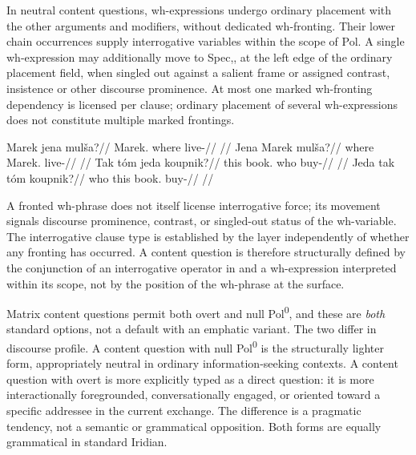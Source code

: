 In neutral content questions, wh-expressions undergo ordinary placement
 with the other arguments and modifiers, without dedicated wh-fronting.
 Their lower chain occurrences supply interrogative variables within the
 scope of Pol. A single wh-expression may additionally move to
 Spec,, at the left edge of the ordinary placement field,
 when singled out against a salient frame or assigned contrast, insistence
 or other discourse prominence. At most one marked wh-fronting dependency
 is licensed per clause; ordinary placement of several wh-expressions does
 not constitute multiple marked frontings.

\pex
\a
\begingl
\gla Marek jena mulša?//
\glb Marek.\Dir{} where live-\Cont{}//
\glft {} //
\endgl
\a
\begingl
\gla Jena Marek mulša?//
\glb where Marek.\Dir{} live-\Cont{}//
\glft {} //
\endgl
\a
\begingl
\gla Tak tóm jeda koupnik?//
\glb this book.\Dir{} who buy-\Pf{}//
\glft {} //
\endgl
\a
\begingl
\gla Jeda tak tóm koupnik?//
\glb who this book.\Dir{} buy-\Pf{}//
\glft {} //
\endgl
\xe

A fronted wh-phrase does not itself license interrogative force; its movement
signals discourse prominence, contrast, or singled-out status of the
wh-variable. The interrogative clause type is established by the 
layer independently of whether any fronting has occurred. A content question is
therefore structurally defined by the conjunction of an interrogative operator
in  and a wh-expression interpreted within its scope, not by the position
of the wh-phrase at the surface.

Matrix content questions permit both overt and null Pol\textsuperscript{0}, and
these are \emph{both} standard options, not a default with an emphatic variant.
The two differ in discourse profile. A content question with null
Pol\textsuperscript{0} is the structurally lighter form, appropriately neutral
in ordinary information-seeking contexts. A content question with overt 
is more explicitly typed as a direct question: it is more interactionally
foregrounded, conversationally engaged, or oriented toward a specific addressee
in the current exchange. The difference is a pragmatic tendency, not a semantic
or grammatical opposition. Both forms are equally grammatical in standard
Iridian.

